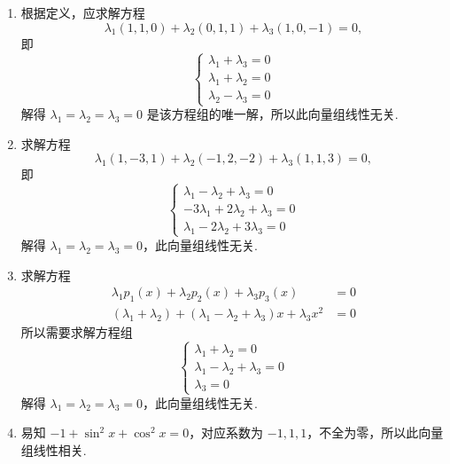 \begin{solution}
    \begin{enumerate}
        \item 根据定义，应求解方程
              \[\lambda_1(1,1,0) + \lambda_2(0,1,1) + \lambda_3(1,0,-1) = 0,\]
              即
              \[ \begin{cases}
                      \lambda_1 + \lambda_3 = 0 \\
                      \lambda_1 + \lambda_2 = 0 \\
                      \lambda_2 - \lambda_3 = 0
                  \end{cases} \]
              解得 $\lambda_1 = \lambda_2 = \lambda_3 = 0$ 是该方程组的唯一解，所以此向量组线性无关.

        \item 求解方程
              \[\lambda_1(1,-3,1) + \lambda_2(-1,2,-2) + \lambda_3(1,1,3) = 0,\]
              即
              \[ \begin{cases}
                      \lambda_1 - \lambda_2 + \lambda_3 = 0    \\
                      -3\lambda_1 + 2\lambda_2 + \lambda_3 = 0 \\
                      \lambda_1 - 2\lambda_2 + 3\lambda_3 = 0
                  \end{cases} \]
              解得 $\lambda_1 = \lambda_2 = \lambda_3 = 0$，此向量组线性无关.

        \item 求解方程
              \begin{align*}
                  \lambda_1p_1(x) + \lambda_2p_2(x) + \lambda_3p_3(x)                           & = 0 \\
                  (\lambda_1 + \lambda_2) + (\lambda_1 - \lambda_2 + \lambda_3)x + \lambda_3x^2 & = 0
              \end{align*}
              所以需要求解方程组
              \[ \begin{cases}
                      \lambda_1 + \lambda_2 = 0             \\
                      \lambda_1 - \lambda_2 + \lambda_3 = 0 \\
                      \lambda_3 = 0
                  \end{cases} \]
              解得 $\lambda_1 = \lambda_2 = \lambda_3 = 0$，此向量组线性无关.

        \item 易知 $-1 + \sin^2x + \cos^2x = 0$，对应系数为 $-1, 1, 1$，不全为零，所以此向量组线性相关.


\end{enumerate}
\end{solution}
